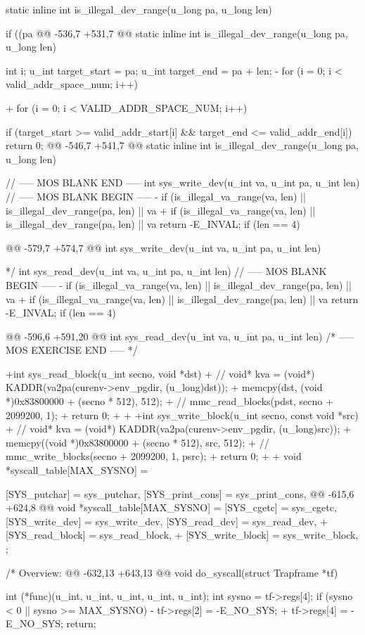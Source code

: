 \begin{CodeBlock}[language=BookC]
{{{ static inline int is_illegal_dev_range(u_long pa, u_long len) {
    if ((pa %
@@ -536,7 +531,7 @@ static inline int is_illegal_dev_range(u_long pa, u_long len) {
    int i;
    u_int target_start = pa;
    u_int target_end = pa + len;
-   for (i = 0; i < valid_addr_space_num; i++) {
+   for (i = 0; i < VALID_ADDR_SPACE_NUM; i++) {
        if (target_start >= valid_addr_start[i] && target_end <= valid_addr_end[i]) {
            return 0;
        }
@@ -546,7 +541,7 @@ static inline int is_illegal_dev_range(u_long pa, u_long len) {
 // ----- MOS BLANK END -----
 int sys_write_dev(u_int va, u_int pa, u_int len) {
    // ----- MOS BLANK BEGIN -----
-   if (is_illegal_va_range(va, len) || is_illegal_dev_range(pa, len) || va %
+   if (is_illegal_va_range(va, len) || is_illegal_dev_range(pa, len) || va %
        return -E_INVAL;
    }
    if (len == 4) {
@@ -579,7 +574,7 @@ int sys_write_dev(u_int va, u_int pa, u_int len) {
  */
 int sys_read_dev(u_int va, u_int pa, u_int len) {
    // ----- MOS BLANK BEGIN -----
-   if (is_illegal_va_range(va, len) || is_illegal_dev_range(pa, len) || va %
+   if (is_illegal_va_range(va, len) || is_illegal_dev_range(pa, len) || va %
        return -E_INVAL;
    }
    if (len == 4) {
@@ -596,6 +591,20 @@ int sys_read_dev(u_int va, u_int pa, u_int len) {
 }
 /* ----- MOS EXERCISE END ----- */
 
+int sys_read_block(u_int secno, void *dst) {
+   // void* kva = (void*) KADDR(va2pa(curenv->env_pgdir, (u_long)dst));
+   memcpy(dst, (void *)0x83800000 + (secno * 512), 512);
+   // mmc_read_blocks(pdst, secno + 2099200, 1);
+   return 0;
+}
+
+int sys_write_block(u_int secno, const void *src) {
+   // void* kva = (void*) KADDR(va2pa(curenv->env_pgdir, (u_long)src));
+   memcpy((void *)0x83800000 + (secno * 512), src, 512);
+   // mmc_write_blocks(secno + 2099200, 1, psrc);
+   return 0;
+}
+
 void *syscall_table[MAX_SYSNO] = {
     [SYS_putchar] = sys_putchar,
     [SYS_print_cons] = sys_print_cons,
@@ -615,6 +624,8 @@ void *syscall_table[MAX_SYSNO] = {
     [SYS_cgetc] = sys_cgetc,
     [SYS_write_dev] = sys_write_dev,
     [SYS_read_dev] = sys_read_dev,
+    [SYS_read_block] = sys_read_block,
+    [SYS_write_block] = sys_write_block,
 };
 
 /* Overview:
@@ -632,13 +643,13 @@ void do_syscall(struct Trapframe *tf) {
    int (*func)(u_int, u_int, u_int, u_int, u_int);
    int sysno = tf->regs[4];
    if (sysno < 0 || sysno >= MAX_SYSNO) {
-       tf->regs[2] = -E_NO_SYS;
+       tf->regs[4] = -E_NO_SYS;
        return;
    }
 
}}}}}}}}}}}}}
\end{CodeBlock}
